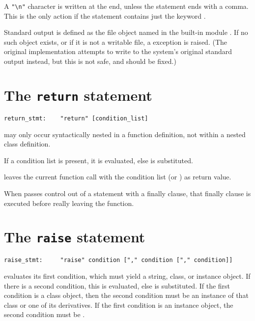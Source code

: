A \verb/"\n"/ character is written at the end, unless the 
statement ends with a comma.  This is the only action if the statement
contains just the keyword .

Standard output is defined as the file object named \verb@stdout@
in the built-in module \verb@sys@.  If no such object exists,
or if it is not a writable file, a  exception is raised.
(The original implementation attempts to write to the system's original
standard output instead, but this is not safe, and should be fixed.)

\section{The {\tt return} statement}

\begin{verbatim}
return_stmt:    "return" [condition_list]
\end{verbatim}

 may only occur syntactically nested in a function
definition, not within a nested class definition.

If a condition list is present, it is evaluated, else 
is substituted.

 leaves the current function call with the condition
list (or ) as return value.

When  passes control out of a  statement
with a finally clause, that finally clause is executed
before really leaving the function.

\section{The {\tt raise} statement}

\begin{verbatim}
raise_stmt:     "raise" condition ["," condition ["," condition]]
\end{verbatim}

 evaluates its first condition, which must yield
a string, class, or instance object.  If there is a second condition,
this is evaluated, else  is substituted.  If the first
condition is a class object, then the second condition must be an
instance of that class or one of its derivatives.  If the first
condition is an instance object, the second condition must be
.

